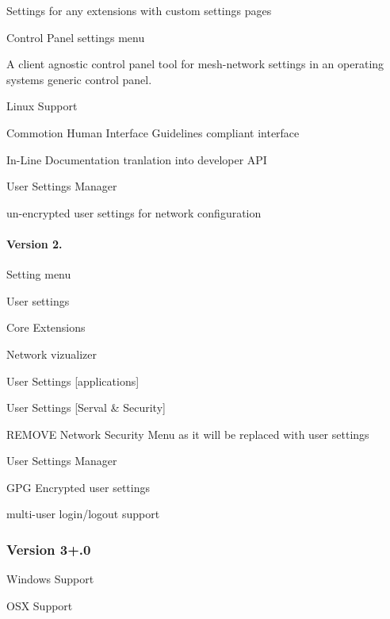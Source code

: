 \begin{DoxyItemize}
\begin{DoxyItemize}
\item Settings for any extensions with custom settings pages
\end{DoxyItemize}
\item Control Panel settings menu
\begin{DoxyItemize}
\item A client agnostic control panel tool for mesh-\/network settings in an operating systems generic control panel.
\end{DoxyItemize}
\item Linux Support
\item Commotion Human Interface Guidelines compliant interface
\item In-\/\+Line Documentation tranlation into developer A\+P\+I
\item User Settings Manager
\begin{DoxyItemize}
\item un-\/encrypted user settings for network configuration
\end{DoxyItemize}
\end{DoxyItemize}

\paragraph*{Version 2.}


\begin{DoxyItemize}
\item Setting menu
\item User settings
\item Core Extensions
\begin{DoxyItemize}
\item Network vizualizer
\item User Settings \mbox{[}applications\mbox{]}
\item User Settings \mbox{[}Serval \& Security\mbox{]}
\end{DoxyItemize}
\item R\+E\+M\+O\+V\+E Network Security Menu as it will be replaced with user settings
\item User Settings Manager
\begin{DoxyItemize}
\item G\+P\+G Encrypted user settings
\end{DoxyItemize}
\item multi-\/user login/logout support
\end{DoxyItemize}

\subsubsection*{Version 3+.0}


\begin{DoxyItemize}
\item Windows Support
\item O\+S\+X Support 
\end{DoxyItemize}